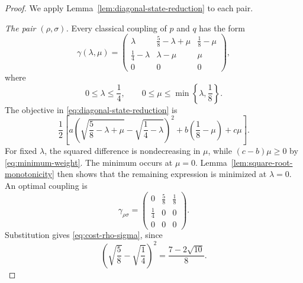 \documentclass[11pt]{article}
\begin{document}
\begin{proof}
    We apply Lemma~\ref{lem:diagonal-state-reduction} to each pair.

    \smallskip
    \noindent\emph{The pair $(\rho,\sigma)$.}
    Every classical coupling of $p$ and $q$ has the form
    \begin{equation}\label{eq:coupling-rho-sigma-parametrization}
        \gamma(\lambda,\mu)=
        \begin{pmatrix}
            \lambda&\frac58-\lambda+\mu&\frac18-\mu\\
            \frac14-\lambda&\lambda-\mu&\mu\\
            0&0&0
        \end{pmatrix},
    \end{equation}
    where
    \[
        0\leq\lambda\leq\frac14,
        \qquad
        0\leq\mu\leq\min\left\{\lambda,\frac18\right\}.
    \]
    The objective in \eqref{eq:diagonal-state-reduction} is
    \[
        \frac12\left[
        a\left(\sqrt{\frac58-\lambda+\mu}
          -\sqrt{\frac14-\lambda}\right)^2
        +b\left(\frac18-\mu\right)+c\mu
        \right].
    \]
    For fixed $\lambda$, the squared difference is nondecreasing in $\mu$,
    while $(c-b)\mu\geq0$ by \eqref{eq:minimum-weight}.  The minimum occurs
    at $\mu=0$.  Lemma~\ref{lem:square-root-monotonicity} then shows that
    the remaining expression is minimized at $\lambda=0$.  An optimal
    coupling is
    \begin{equation}\label{eq:optimal-coupling-rho-sigma}
        \gamma_{\rho\sigma}=
        \begin{pmatrix}
            0&\frac58&\frac18\\
            \frac14&0&0\\
            0&0&0
        \end{pmatrix}.
    \end{equation}
    Substitution gives \eqref{eq:cost-rho-sigma}, since
    \[
        \left(\sqrt{\frac58}-\sqrt{\frac14}\right)^2
        =\frac{7-2\sqrt{10}}8.
    \]


\end{proof}
\end{document}
